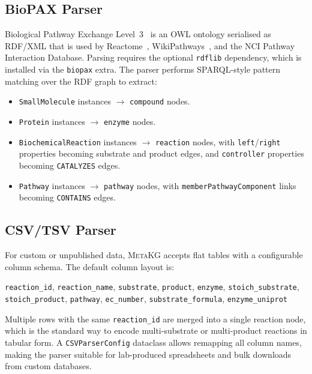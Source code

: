 \documentclass[10pt]{article}
\begin{document}
\subsection{BioPAX Parser}

Biological Pathway Exchange Level~3~\citep{demir2010biopax} is an OWL
ontology serialised as RDF/XML that is used by Reactome~\citep{jassal2020reactome},
WikiPathways~\citep{martens2021wikipathways}, and the NCI Pathway Interaction
Database. Parsing requires the optional \texttt{rdflib} dependency, which is
installed via the \texttt{biopax} extra. The parser performs SPARQL-style
pattern matching over the RDF graph to extract:

\begin{itemize}[leftmargin=*,itemsep=2pt]
  \item \texttt{SmallMolecule} instances $\to$ \texttt{compound} nodes.
  \item \texttt{Protein} instances $\to$ \texttt{enzyme} nodes.
  \item \texttt{BiochemicalReaction} instances $\to$ \texttt{reaction} nodes,
    with \texttt{left}/\texttt{right} properties becoming substrate and
    product edges, and \texttt{controller} properties becoming
    \texttt{CATALYZES} edges.
  \item \texttt{Pathway} instances $\to$ \texttt{pathway} nodes, with
    \texttt{memberPathwayComponent} links becoming \texttt{CONTAINS} edges.
\end{itemize}

\subsection{CSV/TSV Parser}

For custom or unpublished data, \textsc{MetaKG} accepts flat tables with a
configurable column schema. The default column layout is:

\begin{center}
\small
\texttt{reaction\_id}, \texttt{reaction\_name}, \texttt{substrate},
\texttt{product}, \texttt{enzyme}, \texttt{stoich\_substrate},
\texttt{stoich\_product}, \texttt{pathway}, \texttt{ec\_number},
\texttt{substrate\_formula}, \texttt{enzyme\_uniprot}
\end{center}

Multiple rows with the same \texttt{reaction\_id} are merged into a single
reaction node, which is the standard way to encode multi-substrate or
multi-product reactions in tabular form. A \texttt{CSVParserConfig} dataclass
allows remapping all column names, making the parser suitable for lab-produced
spreadsheets and bulk downloads from custom databases.



\end{document}
